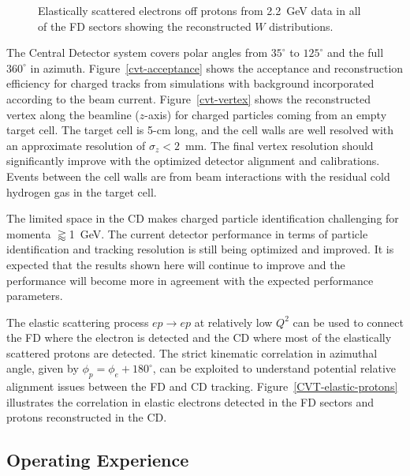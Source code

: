 \documentclass[final,3p]{elsarticle}
\begin{document}
\begin{twocolumn}
\begin{figure}[t!]
\caption{Elastically scattered electrons off protons from 2.2~GeV data in all of the FD sectors showing the
  reconstructed $W$ distributions.}
\label{elastic-electrons}
\end{figure}

The Central Detector system covers polar angles from $35^\circ$ to $125^\circ$ and the full $360^\circ$ in azimuth.
Figure~\ref{cvt-acceptance} shows the acceptance and reconstruction efficiency for charged tracks from simulations
with background incorporated according to the beam current. Figure~\ref{cvt-vertex}  shows the reconstructed
vertex along the beamline ($z$-axis) for charged particles coming from an empty target cell. The target cell is 5-cm
long, and the cell walls are well resolved with an approximate resolution of $\sigma_z<2$~mm. The final vertex
resolution should significantly improve with the optimized detector alignment and calibrations. Events between the cell
walls are from beam interactions with the residual cold hydrogen gas in the target cell.  

The limited space in the CD makes charged particle identification challenging for momenta $\gtrapprox$1~GeV.
The current detector performance in terms of particle identification and tracking resolution is still being optimized
and improved. It is expected that the results shown here will continue to improve and the performance will become
more in agreement with the expected performance parameters.

The elastic scattering process $ep \to ep$ at relatively low $Q^2$ can be used to connect the FD where the electron
is detected and the CD where most of the elastically scattered protons are detected. The strict kinematic correlation
in azimuthal angle, given by  $\phi_p = \phi_e + 180^\circ$,  can be exploited to understand potential relative alignment
issues between the FD and CD tracking. Figure~\ref{CVT-elastic-protons} illustrates the correlation in elastic
electrons detected in the FD sectors and protons reconstructed in the CD. 

\subsection{Operating Experience}


\end{twocolumn}
\end{document}
